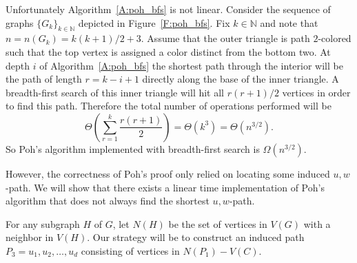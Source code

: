 \documentclass[12pt,letterpaper]{article}
\newcommand{\SolidGraph}{
    \tikzset{every label/.append style={shape=rectangle, draw=none, fill=white,
        scale=1.17 }}
    \tikzset{
        every node/.style={circle, inner sep=0.75mm, fill, draw, minimum size=1.5mm,
        scale=0.85}
    }
}
\theoremstyle{plain}
\theoremstyle{definition}
\theoremstyle{break}
\begin{document}

Unfortunately Algorithm~\ref{A:poh_bfs}
is not linear. Consider the sequence of
graphs $\{G_k\}_{k\in\mathbb{N}}$ depicted in
Figure~\ref{F:poh_bfs}.
Fix $k\in\mathbb{N}$ and note that
$n=n(G_k)=k(k+1)/2+3$. Assume
that the outer triangle is path $2$-colored such that the top vertex is
assigned a color distinct from the bottom two. At depth $i$ of
Algorithm~\ref{A:poh_bfs}
the shortest path through the interior will be the path of length
$r=k-i+1$ directly along the base of the inner triangle. A breadth-first search
of this inner triangle will hit all $r(r+1)/2$ vertices in order to find this
path. Therefore the total number of operations performed will be
\[
    \Theta\left( \sum_{r=1}^k\frac{r(r+1)}{2} \right)
    =\Theta(k^3)
    =\Theta(n^{3/2}).
\]
So Poh's algorithm implemented with breadth-first search is $\Omega(n^{3/2})$.

However, the correctness of Poh's proof only relied on
locating some induced $u,w$-path.
We will show that there exists a linear time implementation of Poh's
algorithm that does not always find the shortest $u,w$-path.

For any subgraph $H$ of $G$, let $N(H)$ be the set of vertices in $V(G)$ with a
neighbor in $V(H)$. Our strategy will be to construct an induced
path $P_3=u_1,u_2,\ldots,u_d$ consisting of vertices in $N(P_1)-V(C)$.
\end{document}
